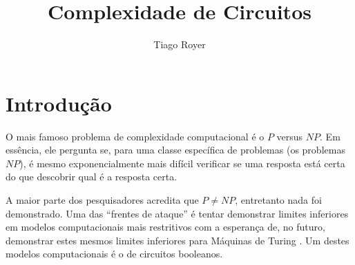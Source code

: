 \documentclass{article}
\theoremstyle{definition}
\begin{document}
\author{Tiago Royer}
\title{Complexidade de Circuitos}

\maketitle

\section{Introdução}

    O mais famoso problema de complexidade computacional é o $P$ versus $NP$.
    Em essência, ele pergunta se,
    para uma classe específica de problemas
    (os problemas $NP$),
    é mesmo exponencialmente mais difícil verificar
    se uma resposta está certa
    do que descobrir qual é a resposta certa.

    A maior parte dos pesquisadores acredita que $P \neq NP$,
    entretanto nada foi demonstrado.
    Uma das ``frentes de ataque'' é tentar demonstrar limites inferiores
    em modelos computacionais mais restritivos com a esperança de,
    no futuro,
    demonstrar estes mesmos limites inferiores para Máquinas de Turing \cite{Hastad1987}.
    Um destes modelos computacionais é o de circuitos booleanos.



\end{document}
